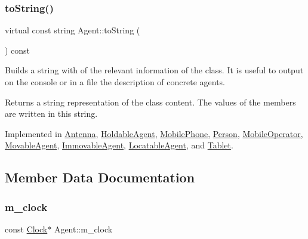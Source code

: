 \subsubsection{\texorpdfstring{to\+String()}{toString()}}
{\footnotesize\ttfamily virtual const string Agent\+::to\+String (\begin{DoxyParamCaption}{ }\end{DoxyParamCaption}) const\hspace{0.3cm}{\ttfamily [pure virtual]}}

Builds a string with of the relevant information of the class. It is useful to output on the console or in a file the description of concrete agents. \begin{DoxyReturn}{Returns}
a string representation of the class content. The values of the members are written in this string. 
\end{DoxyReturn}


Implemented in \hyperlink{class_antenna_a7fea30e065f49a3cbcee02f60bd033c8}{Antenna}, \hyperlink{class_holdable_agent_a2c581226b8994f24b6b2306ae17dbb52}{Holdable\+Agent}, \hyperlink{class_mobile_phone_a2b7e556d12a43e380786ad0eccf3ce04}{Mobile\+Phone}, \hyperlink{class_person_a68872538da519d0a04297f43376db27c}{Person}, \hyperlink{class_mobile_operator_aa83724a149499ef10678ad651a5b40df}{Mobile\+Operator}, \hyperlink{class_movable_agent_a1dee2a6bf93f01006fadfb6fba6c9a59}{Movable\+Agent}, \hyperlink{class_immovable_agent_a805b0d18035550d902d617a8c7ccc062}{Immovable\+Agent}, \hyperlink{class_locatable_agent_a88674f4c8ab9b1b2f3986b226bf4244f}{Locatable\+Agent}, and \hyperlink{class_tablet_a3fae01e7d526699476221c6a686a4fba}{Tablet}.



\subsection{Member Data Documentation}
\mbox{\label{class_agent_a534f22ebb0573aa1d58d274632e592cf}} 
\subsubsection{\texorpdfstring{m\+\_\+clock}{m\_clock}}
{\footnotesize\ttfamily const \hyperlink{class_clock}{Clock}$\ast$ Agent\+::m\+\_\+clock\hspace{0.3cm}{\ttfamily [private]}}

